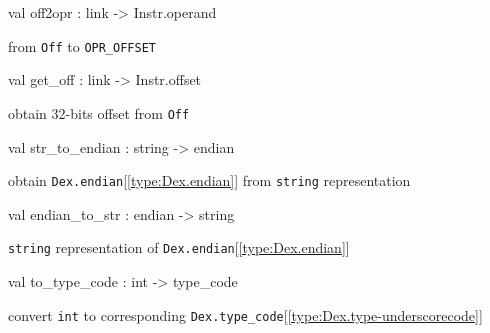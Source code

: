 \documentclass[11pt]{article}
\begin{document}
\label{val:Dex.off2opr}\begin{ocamldoccode}
val off2opr : link -> Instr.operand
\end{ocamldoccode}
\begin{ocamldocdescription}
from {\tt{Off}} to {\tt{OPR\_OFFSET}}


\end{ocamldocdescription}




\label{val:Dex.get-underscoreoff}\begin{ocamldoccode}
val get_off : link -> Instr.offset
\end{ocamldoccode}
\begin{ocamldocdescription}
obtain 32-bits offset from {\tt{Off}}


\end{ocamldocdescription}




\label{val:Dex.str-underscoreto-underscoreendian}\begin{ocamldoccode}
val str_to_endian : string -> endian
\end{ocamldoccode}
\begin{ocamldocdescription}
obtain {\tt{Dex.endian}}[\ref{type:Dex.endian}] from {\tt{string}} representation


\end{ocamldocdescription}




\label{val:Dex.endian-underscoreto-underscorestr}\begin{ocamldoccode}
val endian_to_str : endian -> string
\end{ocamldoccode}
\begin{ocamldocdescription}
{\tt{string}} representation of {\tt{Dex.endian}}[\ref{type:Dex.endian}]


\end{ocamldocdescription}




\label{val:Dex.to-underscoretype-underscorecode}\begin{ocamldoccode}
val to_type_code : int -> type_code
\end{ocamldoccode}
\begin{ocamldocdescription}
convert {\tt{int}} to corresponding {\tt{Dex.type\_code}}[\ref{type:Dex.type-underscorecode}]


\end{ocamldocdescription}
\end{document}

